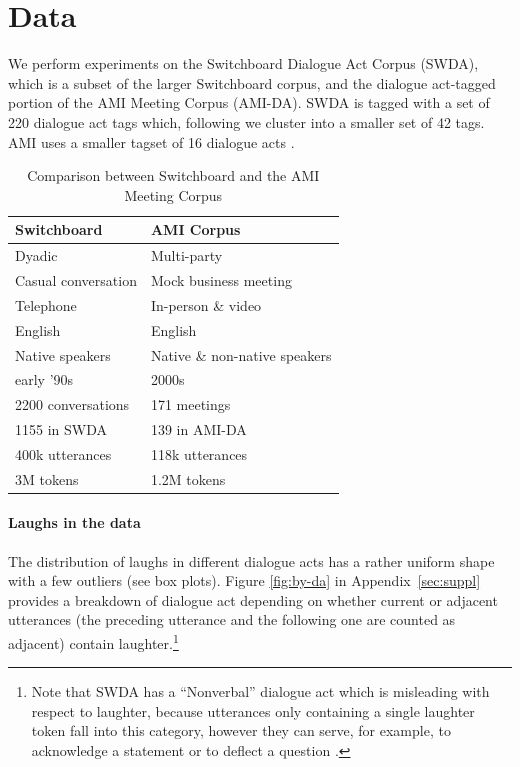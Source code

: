 \documentclass[11pt,a4paper]{article}
\begin{document}
\section{Data}
We perform experiments on the Switchboard Dialogue Act Corpus (SWDA), which is a subset of the larger Switchboard corpus, and the dialogue act-tagged portion of the AMI Meeting Corpus (AMI-DA). 
SWDA is tagged with a set of 220 dialogue act tags which, following  \citet{jurafskySwitchboardSWBDDAMSLShallowDiscourseFunction1997a} we cluster into a smaller set of 42 tags.
AMI uses a smaller tagset of 16 dialogue acts \citep{GuidelinesDialogueAct2005}.


\begin{table}[]
\centering
\begin{tabular}{@{}ll@{}}
\toprule
\textbf{Switchboard}       & \textbf{AMI Corpus}                     \\ \midrule
Dyadic                     & Multi-party                             \\
Casual conversation        & Mock business meeting                   \\
Telephone                  & In-person \& video                      \\ \midrule
English                    & English                                 \\ 
Native speakers            & Native \& non-native speakers           \\ 
early '90s                 & 2000s                                   \\ \midrule
2200 conversations         & 171 meetings                            \\
  \hspace{1em} 1155 in SWDA               & \hspace{1em} 139 in AMI-DA                           \\
400k utterances             & 118k utterances                         \\
3M tokens                  & 1.2M tokens                             \\ \bottomrule
\end{tabular}
  \caption{Comparison between Switchboard and the AMI Meeting Corpus}
  \label{table:corpora}
\end{table}

\paragraph{Laughs in the data}
The distribution of laughs in different dialogue acts has a rather uniform shape with a few outliers (see box plots). Figure \ref{fig:by-da} in Appendix~\ref{sec:suppl} provides a breakdown of dialogue act depending on whether current or adjacent utterances (the preceding utterance and the following one are counted as adjacent) contain laughter.\footnote{Note that SWDA has a ``Nonverbal'' dialogue act which is misleading with respect to laughter, because utterances only containing a single laughter token fall into this category, however they can serve, for example, to acknowledge a statement or to deflect a question  \citep{mazzocconi2019phd}.}
\end{document}
